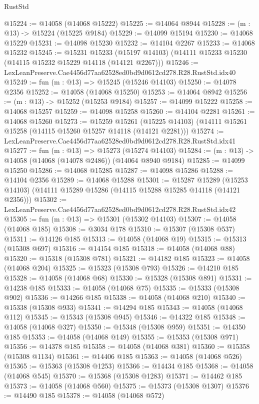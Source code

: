 \begin{lexlean}{RustStd}
\begin{coremodule}
@15224 := @14058 (@14068 @15222)
@15225 := @14064 @8944
@15228 := (m : @13) -> @15224 (@15225 @9184)
@15229 := @14099 @15194
@15230 := @14068 @15229
@15231 := @14098 @15230
@15232 := @14104 @2267
@15233 := @14068 @15232
@15245 := @15231
    @15233
    (@15197 @14103)
    (@14111 @15233 @15230 (@14115 @15232 @15229 @14118 (@14121 @2267)))
@15246 := LexLeanPreserve.Cae4456d77aa62528ed0bd9d0612cd278.R28.RustStd.idx40
@15249 := fun (m : @13) => @15245 (@15246 @14103)
@15250 := @14078 @2356
@15252 := @14058 (@14068 @15250)
@15253 := @14064 @8942
@15256 := (m : @13) -> @15252 (@15253 @9184)
@15257 := @14099 @15222
@15258 := @14068 @15257
@15259 := @14098 @15258
@15260 := @14104 @2281
@15261 := @14068 @15260
@15273 := @15259
    @15261
    (@15225 @14103)
    (@14111 @15261 @15258 (@14115 @15260 @15257 @14118 (@14121 @2281)))
@15274 := LexLeanPreserve.Cae4456d77aa62528ed0bd9d0612cd278.R28.RustStd.idx41
@15277 := fun (m : @13) => @15273 (@15274 @14103)
@15284 := (m : @13) -> @14058 (@14068 (@14078 @2486)) (@14064 @8940 @9184)
@15285 := @14099 @15250
@15286 := @14068 @15285
@15287 := @14098 @15286
@15288 := @14104 @2356
@15289 := @14068 @15288
@15301 := @15287
    @15289
    (@15253 @14103)
    (@14111 @15289 @15286 (@14115 @15288 @15285 @14118 (@14121 @2356)))
@15302 := LexLeanPreserve.Cae4456d77aa62528ed0bd9d0612cd278.R28.RustStd.idx42
@15305 := fun (m : @13) => @15301 (@15302 @14103)
@15307 := @14058 (@14068 @185)
@15308 := @3034 @178
@15310 := @15307 (@15308 @537)
@15311 := @14126 @185
@15313 := @14058 (@14068 @19)
@15315 := @15313 (@15308 @697)
@15316 := @14154 @185
@15318 := @14058 (@14068 @88)
@15320 := @15318 (@15308 @781)
@15321 := @14182 @185
@15323 := @14058 (@14068 @204)
@15325 := @15323 (@15308 @793)
@15326 := @14210 @185
@15328 := @14058 (@14068 @68)
@15330 := @15328 (@15308 @891)
@15331 := @14238 @185
@15333 := @14058 (@14068 @75)
@15335 := @15333 (@15308 @902)
@15336 := @14266 @185
@15338 := @14058 (@14068 @210)
@15340 := @15338 (@15308 @933)
@15341 := @14294 @185
@15343 := @14058 (@14068 @112)
@15345 := @15343 (@15308 @945)
@15346 := @14322 @185
@15348 := @14058 (@14068 @327)
@15350 := @15348 (@15308 @959)
@15351 := @14350 @185
@15353 := @14058 (@14068 @149)
@15355 := @15353 (@15308 @971)
@15356 := @14378 @185
@15358 := @14058 (@14068 @381)
@15360 := @15358 (@15308 @1134)
@15361 := @14406 @185
@15363 := @14058 (@14068 @526)
@15365 := @15363 (@15308 @1253)
@15366 := @14434 @185
@15368 := @14058 (@14068 @545)
@15370 := @15368 (@15308 @1283)
@15371 := @14462 @185
@15373 := @14058 (@14068 @560)
@15375 := @15373 (@15308 @1307)
@15376 := @14490 @185
@15378 := @14058 (@14068 @572)

\end{coremodule}
\end{lexlean}
